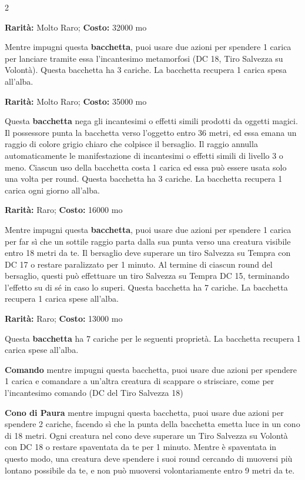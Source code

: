 \begin{multicols}{2}

\textbf{Rarità:} Molto Raro; \textbf{Costo:} 32000 mo

Mentre impugni questa \textbf{bacchetta}, puoi usare due azioni per spendere 1 carica per lanciare tramite essa l'incantesimo metamorfosi (DC 18, Tiro Salvezza su Volontà). Questa bacchetta ha 3 cariche. La bacchetta recupera 1 carica spesa all'alba.


\textbf{Rarità:} Molto Raro; \textbf{Costo:} 35000 mo

Questa \textbf{bacchetta} nega gli incantesimi o effetti simili prodotti da oggetti magici. Il possessore punta la bacchetta verso l'oggetto entro 36 metri, ed essa emana un raggio di colore grigio chiaro che colpisce il bersaglio. Il raggio annulla automaticamente le manifestazione di incantesimi o effetti simili di livello 3 o meno. Ciascun uso della bacchetta costa 1 carica ed essa può essere usata solo una volta per round. Questa bacchetta ha 3 cariche. La bacchetta recupera 1 carica ogni giorno all'alba.


\textbf{Rarità:} Raro; \textbf{Costo:} 16000 mo

Mentre impugni questa \textbf{bacchetta}, puoi usare due azioni per spendere 1 carica per far sì che un sottile raggio parta dalla sua punta verso una creatura visibile entro 18 metri da te. Il bersaglio deve superare un tiro Salvezza su Tempra con DC 17 o restare paralizzato per 1 minuto. Al termine di ciascun round del bersaglio, questi può effettuare un tiro Salvezza su Tempra DC 15, terminando l'effetto su di sé in caso lo superi. Questa bacchetta ha 7 cariche. La bacchetta recupera 1 carica spese all'alba.


\textbf{Rarità:} Raro; \textbf{Costo:} 13000 mo

Questa \textbf{bacchetta} ha 7 cariche per le seguenti proprietà. La bacchetta recupera 1 carica spese all'alba.

\textbf{Comando} mentre impugni questa bacchetta, puoi usare due azioni per spendere 1 carica e comandare a un'altra creatura di scappare o strisciare, come per l'incantesimo comando (DC del Tiro Salvezza 18)

\textbf{Cono di Paura} mentre impugni questa bacchetta, puoi usare due azioni per spendere 2 cariche, facendo sì che la punta della bacchetta emetta luce in un cono di 18 metri. Ogni creatura nel cono deve superare un Tiro Salvezza su Volontà con DC 18 o restare spaventata da te per 1 minuto. Mentre è spaventata in questo modo, una creatura deve spendere i suoi round cercando di muoversi più lontano possibile da te, e non può muoversi volontariamente entro 9 metri da te.


\end{multicols}
